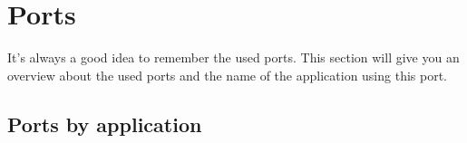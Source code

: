 

\section{Ports}

It's always a good idea to remember the used ports. This section will give
you an overview about the used ports and the name of the application using
this port.

\subsection{Ports by application}

